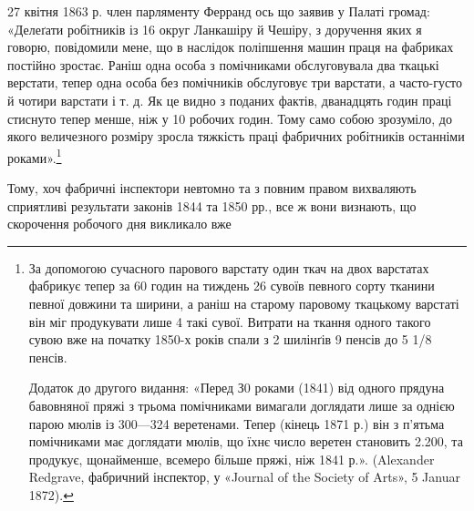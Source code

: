 27 квітня 1863 р. член парляменту Ферранд ось що заявив у
Палаті громад: «Делеґати робітників із 16 округ Ланкашіру й
Чешіру, з доручення яких я говорю, повідомили мене, що в наслідок
поліпшення машин праця на фабриках постійно зростає.
Раніш одна особа з помічниками обслуговувала два ткацькі верстати,
тепер одна особа без помічників обслуговує три варстати,
а часто-густо й чотири варстати і т. д. Як це видно з поданих
фактів, дванадцять годин праці стиснуто тепер менше, ніж у
10 робочих годин. Тому само собою зрозуміло, до якого величезного
розміру зросла тяжкість праці фабричних робітників останніми
роками».\footnote{
За допомогою сучасного парового варстату один ткач на двох
варстатах фабрикує тепер за 60 годин на тиждень 26 сувоїв певного сорту
тканини певної довжини та ширини, а раніш на старому паровому ткацькому
варстаті він міг продукувати лише 4 такі сувої. Витрати на ткання
одного такого сувою вже на початку 1850-х років спали з 2 шилінґів
9 пенсів до 5 1/8 пенсів.

Додаток до другого видання: «Перед З0 роками (1841) від одного прядуна
бавовняної пряжі з трьома помічниками вимагали доглядати лише
за однією парою мюлів із 300—324 веретенами. Тепер (кінець 1871 р.)
він з п’ятьма помічниками має доглядати мюлів, що їхнє число веретен
становить 2.200, та продукує, щонайменше, всемеро більше пряжі, ніж
1841 р.». (Alexander Redgrave, фабричний інспектор, у «Journal of
the Society of Arts», 5 Januar 1872).
}

Тому, хоч фабричні інспектори невтомно та з повним правом
вихваляють сприятливі результати законів 1844 та 1850 рр.,
все ж вони визнають, що скорочення робочого дня викликало вже
\parbreak{}  %
